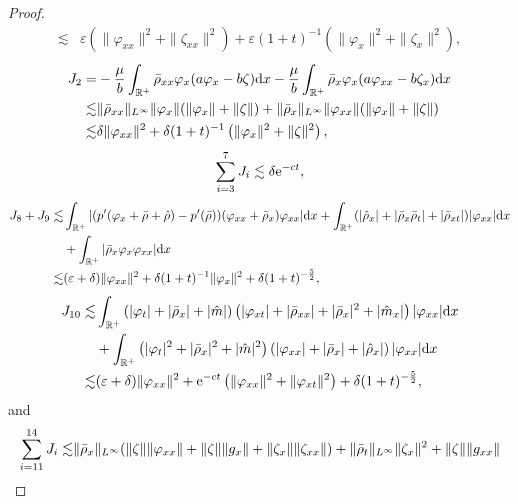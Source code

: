 \documentclass[11pt]{article}
\theoremstyle{plain}
\numberwithin{equation}{section}
\begin{document}
\begin{proof}
\begin{align}
			\lesssim&\varepsilon(\|\varphi_{xx}\|^2+\|\zeta_{xx}\|^2)+\varepsilon(1+t)^{-1}(\|\varphi_x\|^2+\|\zeta_x\|^2),
		\end{align}
\begin{align}\label{13.49}
			J_{2}=&-\frac{\mu}{b}\int_{\mathbb{R}^+}\bar\rho_{xx}\varphi_x(a\varphi_x-b\zeta){\rm d}x-\frac{\mu}{b}\int_{\mathbb{R}^+}\bar\rho_{x}\varphi_x(a\varphi_{xx}-b\zeta_{x}){\rm d}x\notag\\ 
			\lesssim&\|\bar\rho_{xx}\|_{L^{\infty}}\|\varphi_x\|(\|\varphi_x\|+\|\zeta\|)+\|\bar\rho_x\|_{L^{\infty}}\|\varphi_{xx}\|(\|\varphi_{x}\|+\|\zeta\|)\notag\\	
			\lesssim&\delta\|\varphi_{xx}\|^2+\delta(1+t)^{-1}\left(\|\varphi_x\|^2+\|\zeta\|^2\right),
		\end{align}
		\begin{align}\label{13.50}
			\sum_{i=3}^{7}J_i\lesssim \delta{\rm e}^{-ct},
		\end{align}
\begin{align}\label{13.51}
J_{8}+J_{9}\lesssim&\int_{\mathbb{R}^+}|(p^\prime(\varphi_{x}+\bar{\rho}+\hat{\rho})-p^\prime(\bar{\rho}))(\varphi_{xx}+\bar{\rho}_{x})\varphi_{xx}|{\rm d}x+\int_{\mathbb{R}^+}(|\hat{\rho}_{x}|+|\bar{\rho}_{x}\bar{\rho}_{t}|+|\bar{\rho}_{xt}|)|\varphi_{xx}|{\rm d}x\nonumber\\
   &+\int_{\mathbb{R}^+}|\bar{\rho}_{x}\varphi_{x}\varphi_{xx}|{\rm d}x\nonumber\\
   \lesssim& (\varepsilon+\delta)\|\varphi_{xx}\|^{2}+\delta(1+t)^{-1}\|\varphi_{x}\|^{2}+\delta (1+t)^{-\frac{5}{2}},	
\end{align}
\begin{align}\label{13.52}
J_{10}\lesssim&
			\int_{\mathbb{R}^+}\left(|\varphi_t|+|\bar\rho_x|+|\hat m|\right)\left(|\varphi_{xt}|+|\bar\rho_{xx}|+|\bar\rho_x|^2+|\hat m_x|\right)|\varphi_{xx}|{\rm d}x\notag\\
			&+\int_{\mathbb{R}^+}\left(|\varphi_t|^2+|\bar\rho_x|^2+|\hat m|^2\right)\left(|\varphi_{xx}|+|\bar\rho_{x}|+|\hat\rho_x|\right)|\varphi_{xx}|{\rm d}x\notag\\
			\lesssim&(\varepsilon+\delta)\|\varphi_{xx}\|^2+{\rm e}^{-ct}\left(\|\varphi_{xx}\|^2+\|\varphi_{xt}\|^2\right) +\delta(1+t)^{-\frac{5}{2}},	
\end{align}
and
\begin{align}\label{13.53}
			\sum_{i=11}^{14}J_i\lesssim&\|\bar\rho_x\|_{L^{\infty}}(\|\zeta\|\|\varphi_{xx}\|+\|\zeta\|\|g_{x}\|+\|\zeta_x\|\|\zeta_{xx}\|)+\|\bar\rho_t\|_{L^{\infty}}\|\zeta_x\|^2+\|\zeta\|\|g_{xx}\|\notag\\

\end{align}
\end{proof}
\end{document}
